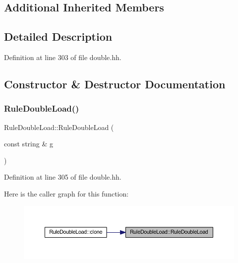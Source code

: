 \subsection*{Additional Inherited Members}


\subsection{Detailed Description}


Definition at line 303 of file double.\+hh.



\subsection{Constructor \& Destructor Documentation}
\mbox{\label{class_rule_double_load_a7b3b8f43136b3421f76abc0c77325e6b}} 
\subsubsection{\texorpdfstring{RuleDoubleLoad()}{RuleDoubleLoad()}}
{\footnotesize\ttfamily Rule\+Double\+Load\+::\+Rule\+Double\+Load (\begin{DoxyParamCaption}\item[{const string \&}]{g }\end{DoxyParamCaption})\hspace{0.3cm}{\ttfamily [inline]}}



Definition at line 305 of file double.\+hh.

Here is the caller graph for this function\+:
\nopagebreak
\begin{figure}[H]
\begin{center}
\leavevmode
\includegraphics[width=350pt]{class_rule_double_load_a7b3b8f43136b3421f76abc0c77325e6b_icgraph}
\end{center}
\end{figure}


